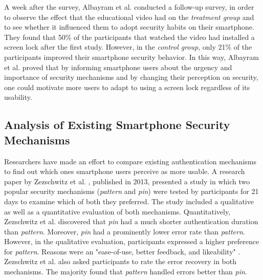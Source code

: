 A week after the survey, Albayram et al. \cite{Albayram:2017:BUL:3235924.3235929} conducted a follow-up survey, in order to observe the effect that the educational video had on the \textit{treatment group} and to see whether it influenced them to adopt security habits on their smartphone. They found that 50\% of the participants that watched the video had installed a screen lock after the first study. However, in the \textit{control group}, only 21\% of the participants improved their smartphone security behavior. In this way, Albayram et al. \cite{Albayram:2017:BUL:3235924.3235929} proved that by informing smartphone users about the urgency and importance of security mechanisms and by changing their perception on security, one could motivate more users to adapt to using a screen lock regardless of its usability. \\

\subsection{Analysis of Existing Smartphone Security Mechanisms} \label{2.2.2}

Researchers have made an effort to compare existing authentication mechanisms to find out which ones smartphone users perceive as more usable. A research paper by Zezschwitz et al. \cite{PatternWild}, published in 2013, presented a study in which two popular security mechanisms (\textit{pattern} and \textit{pin}) were tested by participants for 21 days to examine which of both they preferred. The study included a qualitative as well as a quantitative evaluation of both mechanisms. Quantitatively, Zezschwitz et al. \cite{PatternWild} discovered that \textit{pin} had a much shorter authentication duration than \textit{pattern}. Moreover, \textit{pin} had a prominently lower error rate than \textit{pattern}. However, in the qualitative evaluation, participants expressed a higher preference for \textit{pattern}. Reasons were an "ease-of-use, better feedback, and likeability" \cite{PatternWild}. Zezschwitz et al. \cite{PatternWild} also asked participants to rate the error recovery in both mechanisms. The majority found that \textit{pattern} handled errors better than \textit{pin}.\\

